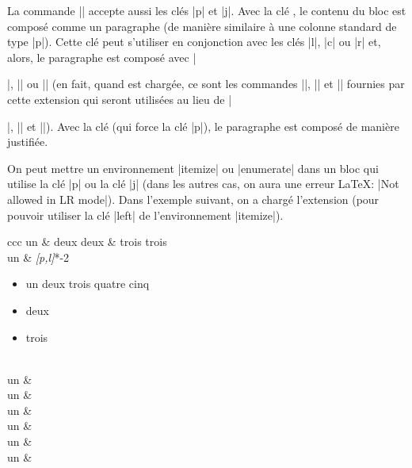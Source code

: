 \documentclass[dvipsnames]{article}
\begin{document}

\bigskip

La commande |\Block| accepte aussi les clés |p| et |j|. Avec la clé
, le contenu du bloc est composé comme un paragraphe (de manière
similaire à une colonne standard de type |p|). Cette clé peut s'utiliser en
conjonction avec les clés |l|, |c| ou |r| et, alors, le paragraphe est composé
avec |\raggedright|, |\centering| ou |\raggedleft| (en fait, quand
 est chargée, ce sont les commandes
|\RaggedRight|, |\Centering| et |\RaggedLeft| fournies par cette extension qui
seront utilisées au lieu de |\raggedright|, |\centering| et |\raggedleft|).
Avec la clé  (qui force la clé |p|), le paragraphe est composé de
manière justifiée. 

\bigskip
On peut mettre un environnement |{itemize}| ou |{enumerate}| dans un bloc qui
utilise la clé |p| ou la clé |j| (dans les autres cas, on aura une erreur LaTeX: 
|Not allowed in LR mode|). Dans l'exemple suivant, on a chargé l'extension
 (pour pouvoir utiliser la clé |left| de l'environnement
|{itemize}|).

\medskip
\begin{Code}
\begin{NiceTabular}[hvlines]{ccc}
un & deux deux & trois trois \\
un & 
\Block\emph{[p,l]}{*-2}{%
\begin{itemize}[\emph{left=0pt}]
\item un deux trois quatre cinq 
\item deux 
\item trois
\end{itemize}%
} \\
un & \\
un & \\
un & \\
un & \\
un & \\
un & \\
\end{NiceTabular}
\end{Code}
\end{document}

